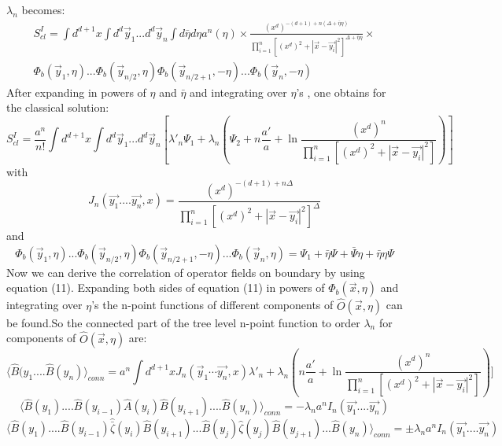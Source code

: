 \documentclass[a4paper,12pt]{article}
\begin{document}
 $\lambda_{n}$ becomes:
\begin{eqnarray}
 S_{cl}^{I}=\int d^{d+1}x\int d^{d}\vec{y}_{1}...d^{d}\vec{y}_{n}\int d\bar{\eta}d\eta
  a^{n}(\eta)\times\frac{(x^{d})^{-(d+1)+n(\Delta+\bar{\eta}\eta)}}{\prod_{i=1}^{n}[(x^{d})^{2}+|\vec{x}-\vec{{y}_{i}}|^{2}]^{\Delta+\bar{\eta}\eta}}\times \nonumber\\
 \Phi_{b}(\vec{y}_{1},\eta)...\Phi_{b}(\vec{y}_{n/2},\eta)\Phi_{b}(\vec{y}_{n/2+1},-\eta)...\Phi_{b}(\vec{y}_{n},-\eta)
\end{eqnarray}
 After expanding in powers of $\eta$ and $\bar{\eta}$ and
 integrating over $\eta$'s , one obtains for the classical
 solution:
 \begin{equation}
 S_{cl}^{I}=\frac{a^{n}}{n!}\int d^{d+1}x\int d^{d}\vec{y}_{1}...d^{d}\vec{y}_{n}[\lambda'_{n}\Psi_{1}+\lambda_{n}(\Psi_{2}+n\frac{a'}{a}+\ln\frac{(x^{d})^{n}}{\prod_{i=1}^{n}[(x^{d})^{2}+|\vec{x}-\vec{y_{i}}|^{2}]})]
 \end{equation}
with
\begin{equation}
J_{n}(\vec{y_{1}}....\vec{y_{n}},x)=\frac{(x^{d})^{-(d+1)+n\Delta}}{\prod_{i=1}^{n}[(x^{d})^{2}+|\vec{x}-\vec{y_{i}}|^{2}]^{\Delta}}
\end{equation} and
\begin{equation}
\Phi_{b}(\vec{y}_{1},\eta)...\Phi_{b}(\vec{y}_{n/2},\eta)\Phi_{b}(\vec{y}_{n/2+1},-\eta)...\Phi_{b}(\vec{y}_{n},\eta)=\Psi_{1}+\bar{\eta}\Psi+\bar{\Psi}\eta+\bar{\eta}\eta\Psi
\end{equation} Now we can derive the correlation of operator
fields on boundary by using equation (11).  Expanding both sides
of equation (11) in powers of $\Phi_{b}(\vec{x},\eta)$ and
integrating over $\eta$'s the n-point functions of different
components of $\hat{O}(\vec{x},\eta)$ can be found.So the
connected part of the tree level n-point function to order
$\lambda_{n}$ for components of $\hat{O}(\vec{x},\eta)$ are:
\begin{equation}
\langle\hat{B}(y_{1}....\hat{B}(y_{n})\rangle_{conn}=a^{n}\int
d^{d+1}x
J_{n}(\vec{y}_{1}\cdots\vec{y_{n}},x)\lambda'_{n}+\lambda_{n}(n\frac{a'}{a}+
\ln\frac{(x^{d})^{n}}{\prod_{i=1}^{n}[(x^{d})^{2}+|\vec{x}-\vec{y_{i}}|^{2}]})]
\end{equation}
\begin{equation}
\langle\hat{B}(y_{1})....\hat{B}(y_{i-1})\hat{A}(y_{i})\hat{B}(y_{i+1})....\hat{B}(y_{n})\rangle_{conn}=-\lambda_{n}a^{n}I_{n}(\vec{y_{1}}....\vec{y_{n}})
\end{equation}
\begin{equation}
\langle\hat{B}(y_{1})....\hat{B}(y_{i-1})\hat{\bar{\zeta}}(y_{i})\hat{B}(y_{i+1})...\hat{B}(y_{j})\hat{\zeta}(y_{j})\hat{B}(y_{j+1})...\hat{B}(y_{n})\rangle_{conn}=\pm\lambda_{n}a^{n}I_{n}(\vec{y_{1}}....\vec{y_{n}})
\end{equation}
\end{document}

